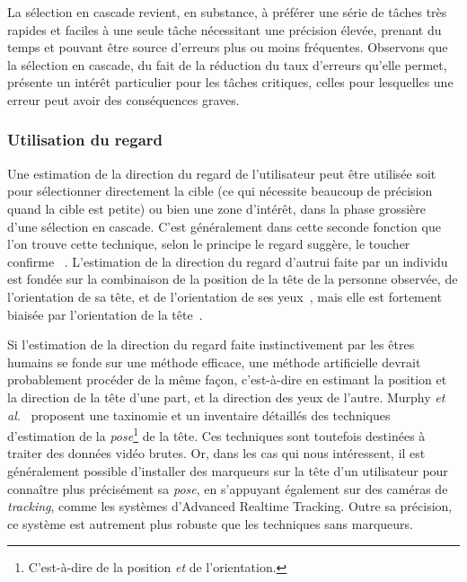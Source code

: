 	La sélection en cascade revient, en substance, à préférer une série de tâches très rapides et faciles à une seule tâche nécessitant une précision élevée, prenant du temps et pouvant être source d'erreurs plus ou moins fréquentes. Observons que la sélection en cascade, du fait de la réduction du taux d'erreurs qu'elle permet, présente un intérêt particulier pour les tâches critiques, celles pour lesquelles une erreur peut avoir des conséquences graves.
	
	\subsubsection{Utilisation du regard}
	Une estimation de la direction du regard de l'utilisateur peut être utilisée soit pour sélectionner directement la cible (ce qui nécessite beaucoup de précision quand la cible est petite) ou bien une zone d'intérêt, dans la phase grossière d'une sélection en cascade. C'est généralement dans cette seconde fonction que l'on trouve cette technique, selon le principe \og le regard suggère, le toucher confirme \fg{}~\cite{stellmach2012look}. L'estimation de la direction du regard d'autrui faite par un individu est fondée sur la combinaison de la position de la tête de la personne observée, de l'orientation de sa tête, et de l'orientation de ses yeux~\cite{langton2004influence}, mais elle est fortement biaisée par l'orientation de la tête~\cite{wollaston1824apparent}.
	
	Si l'estimation de la direction du regard faite instinctivement par les êtres humains se fonde sur une méthode efficace, une méthode artificielle devrait probablement procéder de la même façon, c'est-à-dire en estimant la position et la direction de la tête d'une part, et la direction des yeux de l'autre. Murphy \emph{et al.}~\cite{murphy2009head} proposent une taxinomie et un inventaire détaillés des techniques d'estimation de la \emph{pose}\footnote{C'est-à-dire de la position \emph{et} de l'orientation.} de la tête. Ces techniques sont toutefois destinées à traiter des données vidéo brutes. Or, dans les cas qui nous intéressent, il est généralement possible d'installer des marqueurs sur la tête d'un utilisateur pour connaître plus précisément sa \emph{pose}, en s'appuyant également sur des caméras de \emph{tracking}, comme les systèmes d'Advanced Realtime Tracking.\footnotemark{} Outre sa précision, ce système est autrement plus robuste que les techniques sans marqueurs.
	
	
